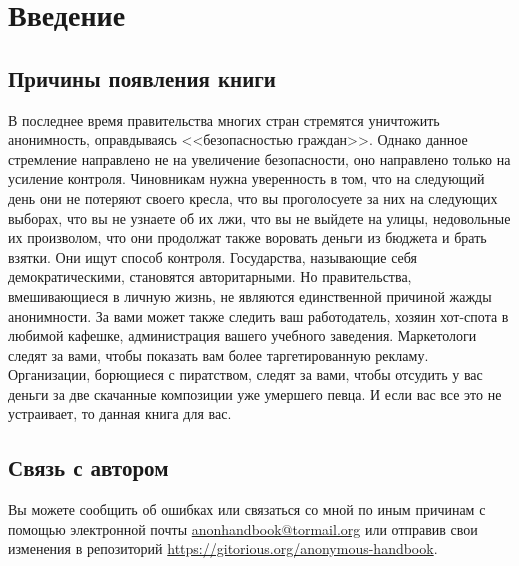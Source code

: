 \chapter{Введение}
\section{Причины появления книги}
В последнее время правительства многих стран стремятся уничтожить анонимность, оправдываясь <<безопасностью граждан>>. Однако данное стремление направлено не на увеличение безопасности, оно направлено только на усиление контроля. Чиновникам нужна уверенность в том, что на следующий день они не потеряют своего кресла, что вы проголосуете за них на следующих выборах, что вы не узнаете об их лжи, что вы не выйдете на улицы, недовольные их произволом, что они продолжат также воровать деньги из бюджета и брать взятки. Они ищут способ контроля. Государства, называющие себя демократическими, становятся авторитарными. Но правительства, вмешивающиеся в личную жизнь, не являются единственной причиной жажды анонимности. За вами может также следить ваш работодатель, хозяин хот-спота в любимой кафешке, администрация вашего учебного заведения. Маркетологи следят за вами, чтобы показать вам более таргетированную рекламу. Организации, борющиеся с пиратством, следят за вами, чтобы отсудить у вас деньги за две скачанные композиции уже умершего певца. И если вас все это не устраивает, то данная книга для вас.

\section{Связь с автором}
Вы можете сообщить об ошибках или связаться со мной по иным причинам с помощью электронной почты \href{mailto:anonhandbook@tormail.org}{anonhandbook@tormail.org} или отправив свои изменения в репозиторий \url{https://gitorious.org/anonymous-handbook}.
